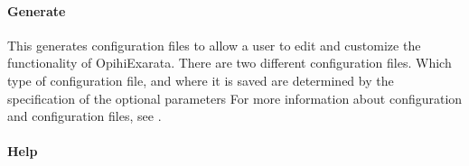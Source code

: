 \documentclass[letterpaper,11pt,english]{sphinxmanual}
\begin{document}
\paragraph{Generate}
\label{\detokenize{user/command_line:generate}}\label{\detokenize{user/command_line:user-command-line-available-actions-generate}}

\begin{savenotes}\begin{fulllineitems}
\label{\detokenize{user/command_line:cmdoption-arg-generate}}\label{\detokenize{user/command_line:cmdoption-arg-g}}
\pysigstartsignatures
{}
\pysigstopsignatures
\end{fulllineitems}\end{savenotes}


\sphinxAtStartPar
This generates configuration files to allow a user to edit and customize the
functionality of OpihiExarata. There are two different configuration files.
Which type of configuration file, and where it is saved are determined by the
specification of the optional parameters
For more information about configuration and configuration files, see
{\hyperref[\detokenize{user/configuration:user-configuration}]{}}.


\paragraph{Help}
\label{\detokenize{user/command_line:help}}\label{\detokenize{user/command_line:user-command-line-available-actions-help}}

\begin{savenotes}\begin{fulllineitems}
\label{\detokenize{user/command_line:cmdoption-arg-help}}\label{\detokenize{user/command_line:cmdoption-arg-h}}
\pysigstartsignatures
{}
\pysigstopsignatures
\end{fulllineitems}\end{savenotes}
\end{document}

